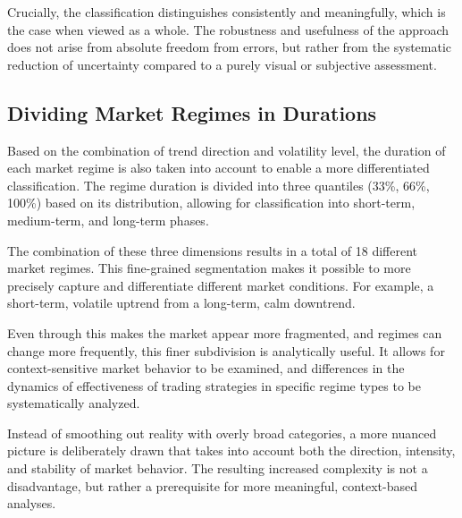 Crucially, the classification distinguishes consistently and meaningfully, which is the case when viewed as a whole.
The robustness and usefulness of the approach does not arise from absolute freedom from errors, but rather from the systematic reduction of uncertainty compared to a purely visual or subjective assessment.

\subsection{Dividing Market Regimes in Durations}

Based on the combination of trend direction and volatility level, the duration of each market regime is also taken into account to enable a more differentiated classification.
The regime duration is divided into three quantiles (33\%, 66\%, 100\%) based on its distribution, allowing for classification into short-term, medium-term, and long-term phases.

The combination of these three dimensions results in a total of 18 different market regimes.
This fine-grained segmentation makes it possible to more precisely capture and differentiate different market conditions.
For example, a short-term, volatile uptrend from a long-term, calm downtrend.

Even through this makes the market appear more fragmented, and regimes can change more frequently, this finer subdivision is analytically useful.
It allows for context-sensitive market behavior to be examined, and differences in the dynamics of effectiveness of trading strategies in specific regime types to be systematically analyzed.

Instead of smoothing out reality with overly broad categories, a more nuanced picture is deliberately drawn that takes into account both the direction, intensity, and stability of market behavior.
The resulting increased complexity is not a disadvantage, but rather a prerequisite for more meaningful, context-based analyses.

